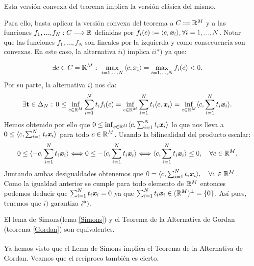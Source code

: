 	\begin{observacion}
		Esta versión convexa del teorema implica la versión clásica del mismo.
	\end{observacion}

	Para ello, basta aplicar la versión convexa del teorema a $ C := \mathbb{R}^M $ y a las funciones $ f_1,...,f_N : C \longrightarrow \mathbb{R} $ definidas por $ f_i(c):=\langle c, \textbf{\emph{x}}_i \rangle , \forall i=1,...,N  $. Notar que las funciones $ f_1,...,f_N $ son lineales por la izquierda y como consecuencia son convexas. En este caso, la alternativa $ ii) $ implica $ ii*) $ ya que:
	
	\begin{equation*}
		\exists c \in C = \mathbb{R}^M \text{ : } \max_{i=1,...,N} {\langle c,x_i \rangle}  =  \max_{i=1,...,N}f_i (c) < 0 .
	\end{equation*}
	Por su parte, la alternativa $ i) $ nos da:
	\begin{equation*}
		\exists \mathbf{t} \in \Delta_N \text{ : } 0 \leq \inf_{c \in \mathbb{R}^M}  \sum_{i=1}^{N}{t_i f_i(c) } = \inf_{c \in \mathbb{R}^M} \sum_{i=1}^{N}{t_i\langle c, \textbf{\emph{x}}_i \rangle} = \inf_{c \in \mathbb{R}^M} \langle c, \sum_{i=1}^{N}{t_i 	\textbf{\emph{x}}_i} \rangle. 
	\end{equation*}
	Hemos obtenido por ello que  $0  \leq \inf_{c \in \mathbb{R}^M} \langle c, \sum_{i=1}^{N}{t_i \textbf{\emph{x}}_i} \rangle  $ lo que nos lleva a $ 0 \leq \langle c, \sum_{i=1}^{N}{t_i \textbf{\emph{x}}_i} \rangle  $ para todo $ c \in \mathbb{R}^M $. Usando la bilinealidad del producto escalar:
	\[
	0 \leq \langle -c, \sum_{i=1}^{N}{t_i \textbf{\emph{x}}_i} \rangle \Longleftrightarrow 	0 \leq -\langle c, \sum_{i=1}^{N}{t_i \textbf{\emph{x}}_i} \rangle 
	\Longleftrightarrow  \langle c, \sum_{i=1}^{N}{t_i \textbf{\emph{x}}_i}\rangle \leq 0, \quad \forall c \in \mathbb{R}^M.
	\]
	Juntando ambas desigualdades obtenemos que $ 0 =  \langle c, \sum_{i=1}^{N}{t_i \textbf{\emph{x}}_i}\rangle, \quad \forall c \in \mathbb{R}^M $. Como la igualdad anterior se cumple para todo elemento de $ \mathbb{R}^M $ entonces podemos deducir que $ \sum_{i=1}^{N}{t_i \textbf{\emph{x}}_i} = 0 $	ya que $ \sum_{i=1}^{N}{t_i \textbf{\emph{x}}_i} \in (\mathbb{R}^M)^{\perp} = \{0\} $. Así pues, tenemos que $ i) $ garantiza $ i*) $.
	
	\begin{observacion}
		El lema de Simons(lema \ref{Simons}) y el Teorema de la Alternativa de Gordan (teorema \ref{Gordan}) son equivalentes.
	\end{observacion}

	\paragraph{} Ya hemos visto que el Lema de Simons implica el Teorema de la Alternativa de Gordan. Veamos que el recíproco también es cierto.  \\
	
